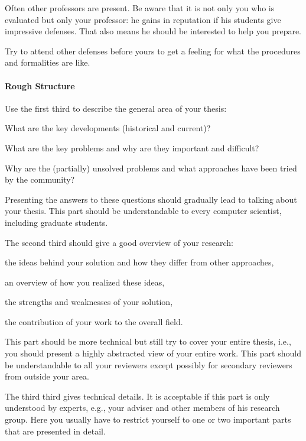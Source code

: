\documentclass[12pt]{article}
\begin{document}
Often other professors are present.
Be aware that it is not only you who is evaluated but only your professor: he gains in reputation if his students give impressive defenses.
That also means he should be interested to help you prepare. 
\medskip

Try to attend other defenses before yours to get a feeling for what the procedures and formalities are like.

\paragraph{Rough Structure}
Use the first third to describe the general area of your thesis:
\begin{compactitem}
 \item What are the key developments (historical and current)?
 \item What are the key problems and why are they important and difficult?
 \item Why are the (partially) unsolved problems and what approaches have been tried by the community?
\end{compactitem}
Presenting the answers to these questions should gradually lead to talking about your thesis.
This part should be understandable to every computer scientist, including graduate students.
\medskip

The second third should give a good overview of your research:
\begin{compactitem}
 \item the ideas behind your solution and how they differ from other approaches,
 \item an overview of how you realized these ideas,
 \item the strengths and weaknesses of your solution,
 \item the contribution of your work to the overall field.
\end{compactitem}
This part should be more technical but still try to cover your entire thesis, i.e., you should present a highly abstracted view of your entire work.
This part should be understandable to all your reviewers except possibly for secondary reviewers from outside your area.
\medskip

The third third gives technical details.
It is acceptable if this part is only understood by experts, e.g., your adviser and other members of his research group.
Here you usually have to restrict yourself to one or two important parts that are presented in detail.
\medskip
\end{document}
